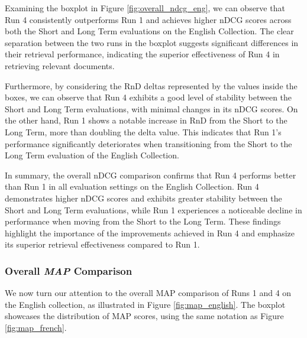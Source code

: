 Examining the boxplot in Figure \ref{fig:overall_ndcg_eng}, we can observe that Run 4 consistently outperforms Run 1 and achieves higher \ac{nDCG} scores across both the Short and Long Term evaluations on the English Collection.  
The clear separation between the two runs in the boxplot suggests significant differences in their retrieval performance, indicating the superior effectiveness of Run 4 in retrieving relevant documents.

Furthermore, by considering the \ac{RnD} deltas represented by the values inside the boxes, we can observe that Run 4 exhibits a good level of stability between the Short and Long Term evaluations, with minimal changes in its \ac{nDCG} scores. 
On the other hand, Run 1 shows a notable increase in \ac{RnD} from the Short to the Long Term, more than doubling the delta value. 
This indicates that Run 1's performance significantly deteriorates when transitioning from the Short to the Long Term evaluation of the English Collection.

In summary, the overall \ac{nDCG} comparison confirms that Run 4 performs better than Run 1 in all evaluation settings on the English Collection. 
Run 4 demonstrates higher \ac{nDCG} scores and exhibits greater stability between the Short and Long Term evaluations, while Run 1 experiences a noticeable decline in performance when moving from the Short to the Long Term. 
These findings highlight the importance of the improvements achieved in Run 4 and emphasize its superior retrieval effectiveness compared to Run 1.

\newpage
\enlargethispage{6\baselineskip}
\subsubsection{Overall \textit{MAP} Comparison} \label{sec:map_comparison_eng}

We now turn our attention to the overall \ac{MAP} comparison of Runs 1 and 4 on the English collection, as illustrated in Figure \ref{fig:map_english}. 
The boxplot showcases the distribution of \ac{MAP} scores, using the same notation as Figure \ref{fig:map_french}.

